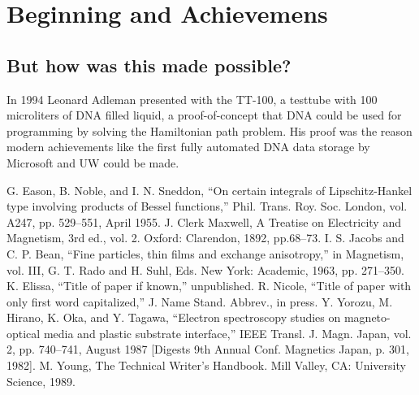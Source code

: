 \documentclass[conference]{IEEEtran}
\begin{document}
\section{Beginning and Achievemens}

\subsection*{But how was this made possible?}
In 1994 Leonard Adleman presented with the TT-100, a testtube with 100 microliters of DNA filled liquid, a proof-of-concept that DNA could be used for programming by solving the Hamiltonian path problem. His proof was the reason modern achievements like the first fully automated DNA data storage by Microsoft and UW could be made.


\begin{thebibliography}{00}
 G. Eason, B. Noble, and I. N. Sneddon, ``On certain integrals of Lipschitz-Hankel type involving products of Bessel functions,'' Phil. Trans. Roy. Soc. London, vol. A247, pp. 529--551, April 1955.
 J. Clerk Maxwell, A Treatise on Electricity and Magnetism, 3rd ed., vol. 2. Oxford: Clarendon, 1892, pp.68--73.
 I. S. Jacobs and C. P. Bean, ``Fine particles, thin films and exchange anisotropy,'' in Magnetism, vol. III, G. T. Rado and H. Suhl, Eds. New York: Academic, 1963, pp. 271--350.
 K. Elissa, ``Title of paper if known,'' unpublished.
 R. Nicole, ``Title of paper with only first word capitalized,'' J. Name Stand. Abbrev., in press.
 Y. Yorozu, M. Hirano, K. Oka, and Y. Tagawa, ``Electron spectroscopy studies on magneto-optical media and plastic substrate interface,'' IEEE Transl. J. Magn. Japan, vol. 2, pp. 740--741, August 1987 [Digests 9th Annual Conf. Magnetics Japan, p. 301, 1982].
 M. Young, The Technical Writer's Handbook. Mill Valley, CA: University Science, 1989.
\end{thebibliography}
\end{document}
